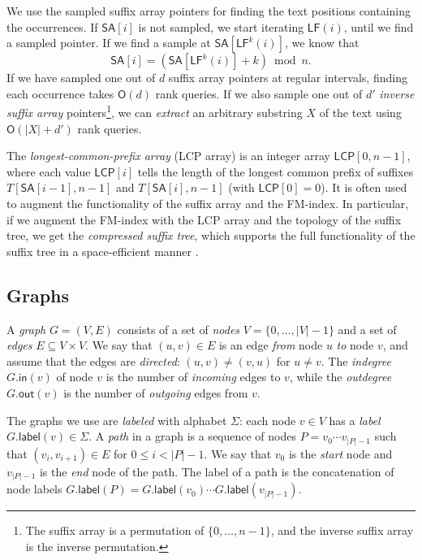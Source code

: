 \documentclass[a4paper,11pt]{llncs}
\newcommand{\set}[1]{\ensuremath{\{ #1 \}}}
\newcommand{\abs}[1]{\ensuremath{\lvert #1 \rvert}}
\newcommand{\Oh}[1]{\ensuremath{\mathsf{O}\!\left( #1 \right)}}
\newcommand{\LF}{\ensuremath{\mathsf{LF}}}
\newcommand{\gindegree}{\ensuremath{\mathsf{in}}}
\newcommand{\goutdegree}{\ensuremath{\mathsf{out}}}
\newcommand{\glabel}{\ensuremath{\mathsf{label}}}
\newcommand{\FMindex}{FM\nobreakdash-index}
\newcommand{\SA}{\ensuremath{\mathsf{SA}}}
\newcommand{\LCP}{\ensuremath{\mathsf{LCP}}}
\begin{document}
We use the sampled suffix array pointers for finding the text positions containing the occurrences. If $\SA[i]$ is not sampled, we start iterating $\LF(i)$, until we find a sampled pointer. If we find a sample at $\SA[\LF^{k}(i)]$, we know that
$$
\SA[i] = (\SA[\LF^{k}(i)] + k) \bmod n.
$$
If we have sampled one out of $d$ suffix array pointers at regular intervals, finding each occurrence takes $\Oh{d}$ rank queries. If we also sample one out of $d'$ \emph{inverse suffix array} pointers\footnote{The suffix array is a permutation of $\set{0, \dotsc, n-1}$, and the inverse suffix array is the inverse permutation.}, we can \emph{extract} an arbitrary substring $X$ of the text using $\Oh{\abs{X}+d'}$ rank queries.

The \emph{longest-common-prefix array} (LCP array) \cite{Manber1993} is an integer array $\LCP[0, n-1]$, where each value $\LCP[i]$ tells the length of the longest common prefix of suffixes $T[\SA[i-1], n-1]$ and $T[\SA[i], n-1]$ (with $\LCP[0] = 0$). It is often used to augment the functionality of the suffix array and the \FMindex. In particular, if we augment the \FMindex{} with the LCP array and the topology of the suffix tree, we get the \emph{compressed suffix tree}, which supports the full functionality of the suffix tree in a space-efficient manner \cite{Sadakane2007}.

\subsection{Graphs}\label{sect:graphs}

A \emph{graph} $G = (V, E)$ consists of a set of \emph{nodes} $V = \set{0, \dotsc, \abs{V}-1}$ and a set of \emph{edges} $E \subseteq V \times V$. We say that $(u, v) \in E$ is an edge \emph{from} node $u$ \emph{to} node $v$, and assume that the edges are \emph{directed}: $(u, v) \ne (v, u)$ for $u \ne v$. The \emph{indegree} $G.\gindegree(v)$ of node $v$ is the number of \emph{incoming} edges to $v$, while the \emph{outdegree} $G.\goutdegree(v)$ is the number of \emph{outgoing} edges from $v$.

The graphs we use are \emph{labeled} with alphabet $\Sigma$: each node $v \in V$ has a \emph{label} $G.\glabel(v) \in \Sigma$. A \emph{path} in a graph is a sequence of nodes $P = v_{0} \dotsm v_{\abs{P}-1}$ such that $(v_{i}, v_{i+1}) \in E$ for $0 \le i < \abs{P}-1$. We say that $v_{0}$ is the \emph{start} node and $v_{\abs{P}-1}$ is the \emph{end} node of the path. The label of a path is the concatenation of node labels $G.\glabel(P) = G.\glabel(v_{0}) \dotsm G.\glabel(v_{\abs{P}-1})$.
\end{document}
